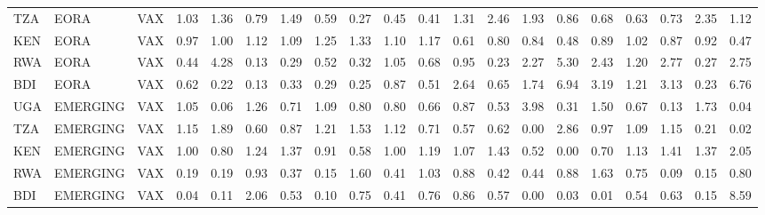 \documentclass[a4paper]{article}
\begin{document}
\begin{table}[ht]
{\begin{tabular}{lllrrrrrrrrrrrrrrrrr}
  TZA & EORA & VAX & 1.03 & 1.36 & 0.79 & 1.49 & 0.59 & 0.27 & 0.45 & 0.41 & 1.31 & 2.46 & 1.93 & 0.86 & 0.68 & 0.63 & 0.73 & 2.35 & 1.12 \\ 
  KEN & EORA & VAX & 0.97 & 1.00 & 1.12 & 1.09 & 1.25 & 1.33 & 1.10 & 1.17 & 0.61 & 0.80 & 0.84 & 0.48 & 0.89 & 1.02 & 0.87 & 0.92 & 0.47 \\ 
  RWA & EORA & VAX & 0.44 & 4.28 & 0.13 & 0.29 & 0.52 & 0.32 & 1.05 & 0.68 & 0.95 & 0.23 & 2.27 & 5.30 & 2.43 & 1.20 & 2.77 & 0.27 & 2.75 \\ 
  BDI & EORA & VAX & 0.62 & 0.22 & 0.13 & 0.33 & 0.29 & 0.25 & 0.87 & 0.51 & 2.64 & 0.65 & 1.74 & 6.94 & 3.19 & 1.21 & 3.13 & 0.23 & 6.76 \\ \midrule
  UGA & EMERGING & VAX & 1.05 & 0.06 & 1.26 & 0.71 & 1.09 & 0.80 & 0.80 & 0.66 & 0.87 & 0.53 & 3.98 & 0.31 & 1.50 & 0.67 & 0.13 & 1.73 & 0.04 \\ 
  TZA & EMERGING & VAX & 1.15 & 1.89 & 0.60 & 0.87 & 1.21 & 1.53 & 1.12 & 0.71 & 0.57 & 0.62 & 0.00 & 2.86 & 0.97 & 1.09 & 1.15 & 0.21 & 0.02 \\ 
  KEN & EMERGING & VAX & 1.00 & 0.80 & 1.24 & 1.37 & 0.91 & 0.58 & 1.00 & 1.19 & 1.07 & 1.43 & 0.52 & 0.00 & 0.70 & 1.13 & 1.41 & 1.37 & 2.05 \\ 
  RWA & EMERGING & VAX & 0.19 & 0.19 & 0.93 & 0.37 & 0.15 & 1.60 & 0.41 & 1.03 & 0.88 & 0.42 & 0.44 & 0.88 & 1.63 & 0.75 & 0.09 & 0.15 & 0.80 \\ 
  BDI & EMERGING & VAX & 0.04 & 0.11 & 2.06 & 0.53 & 0.10 & 0.75 & 0.41 & 0.76 & 0.86 & 0.57 & 0.00 & 0.03 & 0.01 & 0.54 & 0.63 & 0.15 & 8.59 \\ \midrule
  

\end{tabular}}
\end{table}
\end{document}
